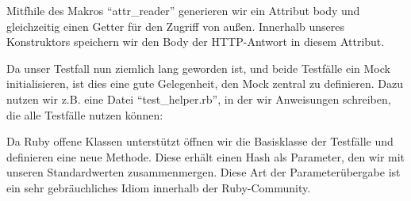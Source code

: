 \tddgreen
Mitfhile des Makros "`attr\_reader"' generieren wir ein Attribut body und gleichzeitig einen Getter für den Zugriff von außen. Innerhalb unseres Konstruktors speichern wir den Body der HTTP-Antwort in diesem Attribut.

\tddrefactor
Da unser Testfall nun ziemlich lang geworden ist, und beide Testfälle ein Mock initialisieren, ist dies eine gute Gelegenheit, den Mock zentral zu definieren. Dazu nutzen wir z.B. eine Datei "`test\_helper.rb"', in der wir Anweisungen schreiben, die alle Testfälle nutzen können:

\begin{ruby}[label=test/test\_helper.rb]
 
   
      
        
        
        
      
      \PY{o}{[}\PY{o}{]}
      \PY{o}{[}\PY{o}{]}
    \PY{o}{[}\PY{o}{]}
\end{ruby}

Da Ruby offene Klassen unterstützt öffnen wir die Basisklasse der Testfälle und definieren eine neue Methode. Diese erhält einen Hash als Parameter, den wir mit unseren Standardwerten zusammenmergen. Diese Art der Parameterübergabe ist ein sehr gebräuchliches Idiom innerhalb der Ruby-Community.
\tddrefactor

